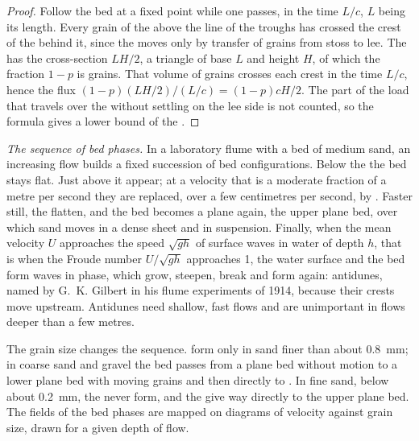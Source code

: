\begin{proof}
Follow the bed at a fixed point while one  passes, in the time $L/c$, $L$
being its length. Every grain of the  above the line of the troughs has
crossed the crest of the  behind it, since the  moves only by
transfer of grains from stoss to lee. The  has the cross-section $LH/2$, a
triangle of base $L$ and height $H$, of which the fraction $1 - p$ is grains.
That volume of grains crosses each crest in the time $L/c$, hence the flux
$(1-p)(LH/2)/(L/c) = (1-p)cH/2$. The part of the load that travels over the
 without settling on the lee side is not counted, so the formula gives
a lower bound of the .
\end{proof}

\emph{The sequence of bed phases.} In a laboratory flume with a bed of medium
sand, an increasing flow builds a fixed succession of bed configurations.
Below the  the bed stays flat. Just above it  appear;
at a velocity that is a moderate fraction of a metre per second they are
replaced, over a few centimetres per second, by . Faster still, the 
flatten, and the bed becomes a plane again, the upper plane bed, over which sand
moves in a dense sheet and in suspension. Finally, when the mean velocity $U$
approaches the speed $\sqrt{gh}$ of surface waves in water of depth $h$, that is
when the Froude number $U/\sqrt{gh}$ approaches 1, the water surface and the bed
form waves in phase, which grow, steepen, break and form again: antidunes, named
by G.~K. Gilbert in his flume experiments of 1914, because their crests move
upstream. Antidunes need shallow, fast flows and are unimportant in flows deeper
than a few metres.

The grain size changes the sequence.  form only in sand finer than about
\qty{0.8}{mm}; in coarse sand and gravel the bed passes from a plane bed without
motion to a lower plane bed with moving grains and then directly to . In
fine sand, below about \qty{0.2}{mm}, the  never form, and the 
give way directly to the upper plane bed. The fields of the bed phases are
mapped on diagrams of velocity against grain size, drawn for a given depth of
flow.

